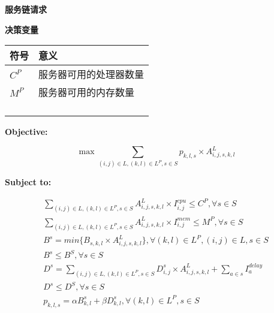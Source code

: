 \textbf{服务链请求}

\textbf{决策变量}

\begin{table}[htb]
	\centering
	\begin{tabular}{ | l | p{6cm} |}\hline
		\textbf{符号} &							 \textbf{意义}  				\\ 	\hline
		$C^{P}$   &	服务器可用的处理器数量  \\ \hline
		$M^{P}$	  & 服务器可用的内存数量    \\ \hline
	           &    \\ \hline
	 		   &    \\ \hline
	           &    \\ \hline
	           &    \\ \hline
	\end{tabular}
\end{table}


\textbf{Objective:} 

\begin{equation}
\max \sum_{(i,j)\in L , (k,l)\in L^{P}, s \in S} p_{k,l,s} \times A_{i,j,s,k,l}^{L}
\end{equation}

\textbf{Subject to:} 

\begin{align}	
	\sum_{(i,j)\in L,(k,l) \in L^{P},s\in S}A_{i,j,s,k,l}^{L} \times I^{cpu}_{i,j}  \leq C^{P},\forall s \in S \\
	\sum_{(i,j)\in L,(k,l) \in L^{P},s\in S}A_{i,j,s,k,l}^{L} \times I^{mem}_{i,j} \leq M^{P}, \forall s \in S \\ %
	B^{s} = min \{B_{s,k,l} \times A_{i,j,s,k,l}^{L} \}, \forall (k,l) \in L^{P}, (i,j) \in L, s \in S \\ %
	B^{s} \leq B^{S}, \forall s \in S \\ %
	D^{s} = \sum_{(i,j) \in L,(k,l) \in L^{P}, s\in S} D^{s}_{i,j} \times A_{i,j,s,k,l}^{L} + \sum_{a \in s} I_{a}^{delay}  \\ %
	D^{s} \leq D^{S},\forall s \in S\\ %
	p_{k,l,s} = \alpha B^{s}_{k,l} + \beta D^{s}_{k,l} , \forall (k,l) \in L^{P}, s\in S%
\end{align}

